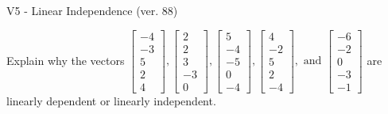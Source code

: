 \begin{exercise}
  \begin{exerciseTitle}V5 - Linear Independence (ver. 88)\end{exerciseTitle}
  \begin{exerciseStatement}
    Explain why the vectors \(\left[\begin{array}{r}
-4 \\
-3 \\
5 \\
2 \\
4
\end{array}\right] , \left[\begin{array}{r}
2 \\
2 \\
3 \\
-3 \\
0
\end{array}\right] , \left[\begin{array}{r}
5 \\
-4 \\
-5 \\
0 \\
-4
\end{array}\right] , \left[\begin{array}{r}
4 \\
-2 \\
5 \\
2 \\
-4
\end{array}\right] , \text{ and } \left[\begin{array}{r}
-6 \\
-2 \\
0 \\
-3 \\
-1
\end{array}\right]\) are linearly dependent or linearly independent.	



\end{exerciseStatement}
\end{exercise}
